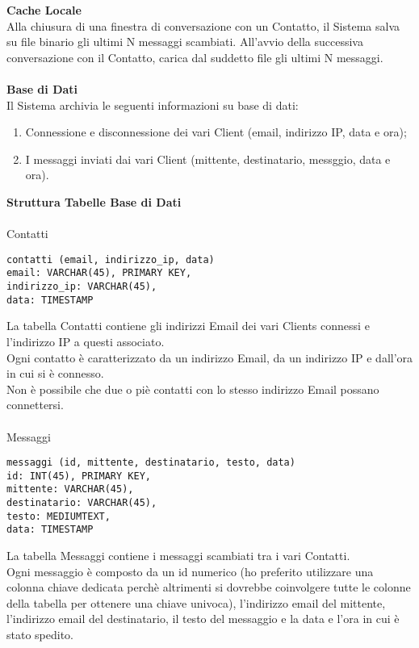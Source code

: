 \documentclass[a4paper, 11pt]{article} %
\begin{document}
\vspace{0.5cm}
\textbf{Cache Locale}\\
Alla chiusura di una finestra di conversazione con un Contatto, il Sistema salva su file binario gli ultimi N messaggi scambiati. All'avvio della successiva conversazione con il Contatto, carica dal suddetto file gli ultimi N messaggi.\\
\\
\textbf{Base di Dati}\\
Il Sistema archivia le seguenti informazioni su base di dati:
\begin{enumerate}
\item Connessione e disconnessione dei vari Client (email, indirizzo IP, data e ora);
\item I messaggi inviati dai vari Client (mittente, destinatario, messggio, data e ora).
\end{enumerate}
\vspace{0.5cm}
\textbf{Struttura Tabelle Base di Dati}\\
\\
Contatti
\lstset{language=sql}
\begin{lstlisting}[frame=single]
contatti (email, indirizzo_ip, data)
email: VARCHAR(45), PRIMARY KEY,
indirizzo_ip: VARCHAR(45),
data: TIMESTAMP
\end{lstlisting}
La tabella Contatti contiene gli indirizzi Email dei vari Clients connessi e l'indirizzo IP a questi associato.\\
Ogni contatto \`e caratterizzato da un indirizzo Email, da un indirizzo IP e dall'ora in cui si \`e connesso.\\
Non \`e possibile che due o pi\`e contatti con lo stesso indirizzo Email possano connettersi.\\
\\
Messaggi
\lstset{language=sql}
\begin{lstlisting}[frame=single]
messaggi (id, mittente, destinatario, testo, data)
id: INT(45), PRIMARY KEY,
mittente: VARCHAR(45),
destinatario: VARCHAR(45),
testo: MEDIUMTEXT,
data: TIMESTAMP
\end{lstlisting}
La tabella Messaggi contiene i messaggi scambiati tra i vari Contatti.\\
Ogni messaggio \`e composto da un id numerico (ho preferito utilizzare una colonna chiave dedicata perch\`e altrimenti si dovrebbe coinvolgere tutte le colonne della tabella per ottenere una chiave univoca), l'indirizzo email del mittente, l'indirizzo email del destinatario, il testo del messaggio e la data e l'ora in cui \`e stato spedito.\\
\end{document}
